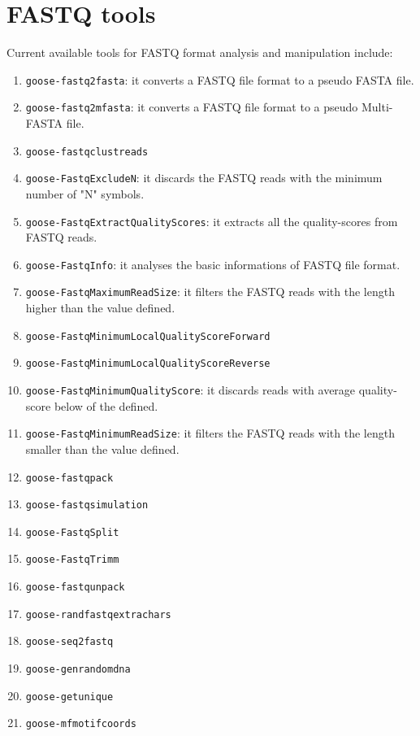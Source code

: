 \chapter{FASTQ tools}
\label{fastq}

Current available tools for FASTQ format analysis and manipulation include:
\begin{enumerate}

\item \texttt{goose-fastq2fasta}: it converts a FASTQ file format to a pseudo FASTA file.
\item \texttt{goose-fastq2mfasta}: it converts a FASTQ file format to a pseudo Multi-FASTA file.
\item \texttt{goose-fastqclustreads}
\item \texttt{goose-FastqExcludeN}: it discards the FASTQ reads with the minimum number of "N" symbols.
\item \texttt{goose-FastqExtractQualityScores}: it extracts all the quality-scores from FASTQ reads.
\item \texttt{goose-FastqInfo}: it analyses the basic informations of FASTQ file format.
\item \texttt{goose-FastqMaximumReadSize}: it filters the FASTQ reads with the length higher than the value defined.
\item \texttt{goose-FastqMinimumLocalQualityScoreForward}
\item \texttt{goose-FastqMinimumLocalQualityScoreReverse}
\item \texttt{goose-FastqMinimumQualityScore}: it discards reads with average quality-score below of the defined.
\item \texttt{goose-FastqMinimumReadSize}: it filters the FASTQ reads with the length smaller than the value defined.
\item \texttt{goose-fastqpack}
\item \texttt{goose-fastqsimulation}
\item \texttt{goose-FastqSplit}
\item \texttt{goose-FastqTrimm}
\item \texttt{goose-fastqunpack}
\item \texttt{goose-randfastqextrachars}
\item \texttt{goose-seq2fastq}

\item \texttt{goose-genrandomdna}
\item \texttt{goose-getunique}
\item \texttt{goose-mfmotifcoords}


\end{enumerate}
